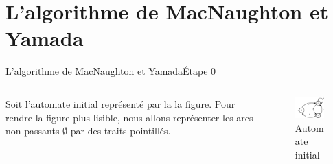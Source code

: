 \documentclass{beamer}
\begin{document}
\section{L'algorithme de MacNaughton et Yamada}
\begin{frame}{L'algorithme de MacNaughton et Yamada}{Étape 0}
     \begin{columns}[T]
     \begin{column}{.48\textwidth}
        \indent Soit l’automate initial représenté par la la figure.
        \newline
        \newline
        \indent Pour rendre la figure plus lisible, nous allons représenter les arcs non passants $\emptyset$ par des traits pointillés.
     
     
     \end{column}
     
     \begin{column}{.48\textwidth}
     \begin{figure}
     \includegraphics[scale=0.37]{Diagramme1.png}
     \centering
     \caption{Automate initial}     
     \end{figure}
     \end{column}
        
     \end{columns}

\end{frame}
\end{document}
